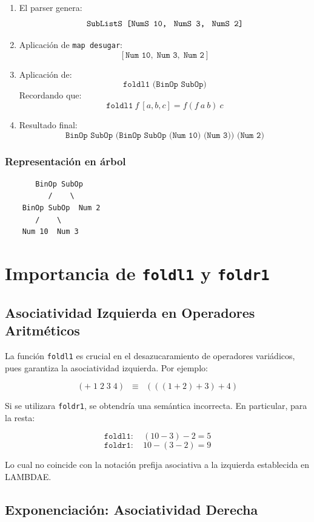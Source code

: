 \documentclass[a4paper,12pt]{article}
\begin{document}
\begin{tcolorbox}[title= Corrección: Desugar modulo A4, breakable]
\begin{enumerate}
    \item El parser genera:
    \[
    \texttt{SubListS [NumS 10,\; NumS 3,\; NumS 2]}
    \]
    \item Aplicación de \texttt{map desugar}:
    \[
    [\texttt{Num 10},\; \texttt{Num 3},\; \texttt{Num 2}]
    \]
    \item Aplicación de:
    \[
    \texttt{foldl1 (BinOp SubOp)}
    \]
    Recordando que:
    \[
    \texttt{foldl1}\ f\ [a, b, c] = f (f\ a\ b)\ c
    \]
    \item Resultado final:
    \[
    \texttt{BinOp SubOp (BinOp SubOp (Num 10)\ (Num 3))\ (Num 2)}
    \]
\end{enumerate}

\subsubsection*{Representación en árbol}

\begin{verbatim}
       BinOp SubOp
          /    \
    BinOp SubOp  Num 2
       /    \
    Num 10  Num 3
\end{verbatim}

\section{Importancia de \texttt{foldl1} y \texttt{foldr1}}

\subsection{Asociatividad Izquierda en Operadores Aritméticos}

La función \texttt{foldl1} es crucial en el desazucaramiento de operadores variádicos, pues garantiza la asociatividad izquierda. Por ejemplo:

\[
(+\; 1\; 2\; 3\; 4)
\;\;\equiv\;\;
(((1 + 2) + 3) + 4)
\]

Si se utilizara \texttt{foldr1}, se obtendría una semántica incorrecta. En particular, para la resta:

\[
\texttt{foldl1}:\quad (10 - 3) - 2 = 5
\]
\[
\texttt{foldr1}:\quad 10 - (3 - 2) = 9
\]

Lo cual no coincide con la notación prefija asociativa a la izquierda establecida en LAMBDAE.

\subsection{Exponenciación: Asociatividad Derecha}


\end{tcolorbox}
\end{document}
